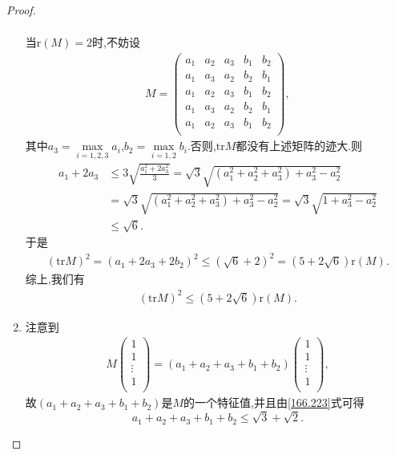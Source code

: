 \documentclass[../../main.tex]{subfiles}
\begin{document}
\begin{proof}
\begin{enumerate}[(1)]
\begin{align*}
\end{align*}
当$\mathrm{r}\left( M \right) =2$时,不妨设
\begin{align*}
M=\begin{pmatrix}
a_1&	a_2&	a_3&	b_1&	b_2\\
a_1&	a_3&	a_2&	b_2&	b_1\\
a_1&	a_2&	a_3&	b_1&	b_2\\
a_1&	a_3&	a_2&	b_2&	b_1\\
a_1&	a_2&	a_3&	b_1&	b_2\\
\end{pmatrix},
\end{align*}
其中$a_3=\max\limits_{i=1,2,3}a_i$,$b_2=\max\limits_{i=1,2}b_i$.否则,$\mathrm{tr}M$都没有上述矩阵的迹大.则
\begin{align*}
a_1+2a_3&\leqslant 3\sqrt{\frac{a_{1}^{2}+2a_{3}^{2}}{3}}=\sqrt{3}\sqrt{\left( a_{1}^{2}+a_{2}^{2}+a_{3}^{2} \right) +a_{3}^{2}-a_{2}^{2}}\\
&=\sqrt{3}\sqrt{\left( a_{1}^{2}+a_{2}^{2}+a_{3}^{2} \right) +a_{3}^{2}-a_{2}^{2}}=\sqrt{3}\sqrt{1+a_{3}^{2}-a_{2}^{2}}\\
&\leqslant \sqrt{6}.
\end{align*}
于是
\begin{align*}
\left( \mathrm{tr}M \right) ^2=\left( a_1+2a_3+2b_2 \right) ^2\leqslant \left( \sqrt{6}+2 \right) ^2=\left( 5+2\sqrt{6} \right) \mathrm{r}\left( M \right).
\end{align*}
综上,我们有
\begin{align*}
\left( \mathrm{tr}M \right) ^2\leqslant \left( 5+2\sqrt{6} \right) \mathrm{r}\left( M \right).
\end{align*}

\item 注意到
\begin{align*}
M\left( \begin{array}{c}
1\\
1\\
\vdots\\
1\\
\end{array} \right) =\left( a_1+a_2+a_3+b_1+b_2 \right) \left( \begin{array}{c}
1\\
1\\
\vdots\\
1\\
\end{array} \right) ,
\end{align*}
故$\left( a_1+a_2+a_3+b_1+b_2 \right)$是$M$的一个特征值,并且由\eqref{166.223}式可得$$a_1+a_2+a_3+b_1+b_2\leqslant \sqrt{3}+\sqrt{2}.$$
\end{enumerate}
\end{proof}
\end{document}
